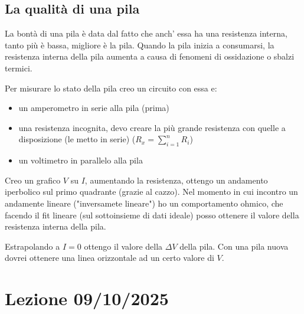 \documentclass{article}
\begin{document}
\subsection{La qualità di una pila}
La bontà di una pila è data dal fatto che anch' essa ha una resistenza interna, tanto più è bassa, migliore è la pila.
Quando la pila inizia a consumarsi, la resistenza interna della pila aumenta a causa di fenomeni di ossidazione o sbalzi termici. 

Per misurare lo stato della pila creo un circuito con essa e:
\begin{itemize}
\item un amperometro in serie alla pila (prima)
\item una resistenza incognita, devo creare la più grande resistenza con quelle a disposizione (le metto in serie) ($R_x = \sum_{i=1}^{n} R_i$)
\item un voltimetro in parallelo alla pila
\end{itemize} 
\begin{center}
\end{center}
Creo un grafico $V$ su $I$, aumentando la resistenza, ottengo un andamento iperbolico sul primo quadrante (grazie al cazzo). 
Nel momento in cui incontro un andamente lineare ("inversamete lineare") ho un comportamento ohmico, che facendo il fit lineare (sul sottoinsieme di dati ideale) posso ottenere il valore della resistenza interna della pila. 

Estrapolando a $I=0$ ottengo il valore della $\Delta V$ della pila. Con una pila nuova dovrei ottenere una linea orizzontale ad un certo valore di $V$.

\section{Lezione 09/10/2025}
\end{document}
